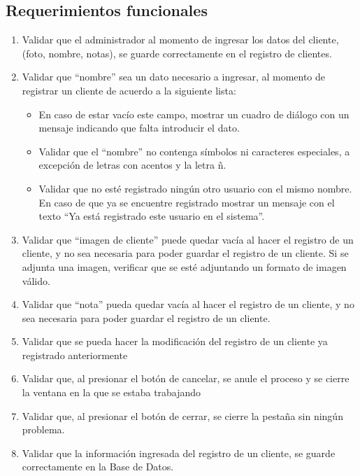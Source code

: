 \documentclass[a4paper,DIV=12]{scrreprt}
\begin{document}
\subsection*{Requerimientos funcionales}
\begin{enumerate}
	\item{Validar que el administrador al momento de ingresar los datos del cliente, (foto, nombre, notas), se guarde correctamente en el registro de clientes. \\}
	\item{Validar que “nombre” sea un dato necesario a ingresar, al momento de registrar un cliente de acuerdo a la siguiente lista:\\}
	    \begin{itemize}
	        \item {En caso de estar vacío este campo, mostrar un cuadro de diálogo con un mensaje indicando que falta introducir el dato. }
	         \item {Validar que el “nombre” no contenga símbolos ni caracteres especiales, a excepción de letras con acentos y la letra ñ. }
	          \item {Validar que no esté registrado ningún otro usuario con el mismo nombre. En caso de que ya se encuentre registrado mostrar un mensaje con el texto “Ya está registrado este usuario en el sistema”.}
	    \end{itemize}
	\item{Validar que “imagen de cliente” puede quedar vacía al hacer el registro de un cliente, y no sea necesaria para poder guardar el registro de un cliente.
Si se adjunta una imagen, verificar que se esté adjuntando un formato de imagen válido.
\\}
	\item{Validar que “nota” pueda quedar vacía al hacer el registro de un cliente, y no sea necesaria para poder guardar el registro de un cliente. \\}
	\item{Validar que se pueda hacer la modificación del registro de un cliente ya registrado anteriormente\\}
	\item{Validar que, al presionar el botón de cancelar, se anule el proceso y se cierre la ventana en la que se estaba trabajando\\}
	\item{Validar que, al presionar el botón de cerrar, se cierre la pestaña sin ningún problema. \\}
	\item{Validar que la información ingresada del registro de un cliente, se guarde correctamente en la Base de Datos. \\}
\end{enumerate}
\newpage
\end{document}
